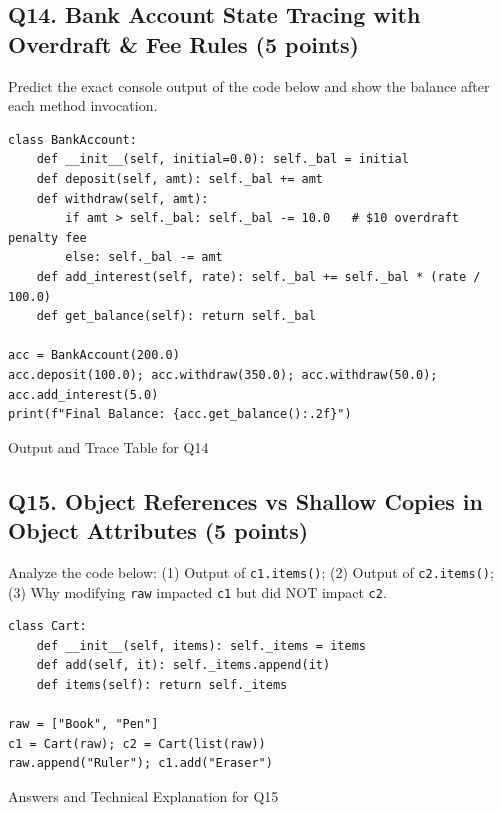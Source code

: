 \documentclass[11pt,a4paper]{article}
\begin{document}
\subsection*{Q14. Bank Account State Tracing with Overdraft \& Fee Rules (5 points)}
Predict the exact console output of the code below and show the balance after each method invocation.
\begin{lstlisting}
class BankAccount:
    def __init__(self, initial=0.0): self._bal = initial
    def deposit(self, amt): self._bal += amt
    def withdraw(self, amt):
        if amt > self._bal: self._bal -= 10.0   # $10 overdraft penalty fee
        else: self._bal -= amt
    def add_interest(self, rate): self._bal += self._bal * (rate / 100.0)
    def get_balance(self): return self._bal

acc = BankAccount(200.0)
acc.deposit(100.0); acc.withdraw(350.0); acc.withdraw(50.0); acc.add_interest(5.0)
print(f"Final Balance: {acc.get_balance():.2f}")
\end{lstlisting}
\begin{answerbox}[height=2.3cm]{Output and Trace Table for Q14}\end{answerbox}
\subsection*{Q15. Object References vs Shallow Copies in Object Attributes (5 points)}
Analyze the code below: (1) Output of \texttt{c1.items()}; (2) Output of \texttt{c2.items()}; (3) Why modifying \texttt{raw} impacted \texttt{c1} but did NOT impact \texttt{c2}.
\begin{lstlisting}
class Cart:
    def __init__(self, items): self._items = items
    def add(self, it): self._items.append(it)
    def items(self): return self._items

raw = ["Book", "Pen"]
c1 = Cart(raw); c2 = Cart(list(raw))
raw.append("Ruler"); c1.add("Eraser")
\end{lstlisting}
\begin{answerbox}[height=2.1cm]{Answers and Technical Explanation for Q15}\end{answerbox}
\newpage
\end{document}
